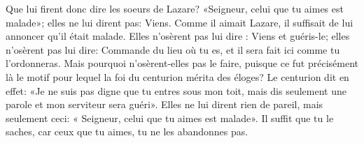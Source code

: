 Que lui firent donc dire les soeurs de Lazare?
	«Seigneur, celui que tu aimes est malade»;
	elles ne lui dirent pas: Viens.
Comme il aimait Lazare, il suffisait de lui annoncer qu’il était malade.
Elles n’osèrent pas lui dire : Viens et guéris-le;
	elles n’osèrent pas lui dire:
	Commande du lieu où tu es, et il sera fait ici comme tu l’ordonneras.
Mais pourquoi n’osèrent-elles pas le faire,
	puisque ce fut précisément là le motif
		pour lequel la foi du centurion mérita des éloges?
Le centurion dit en effet:
	«Je ne suis pas digne que tu entres sous mon toit,
	mais dis seulement une parole et mon serviteur sera guéri».
Elles ne lui dirent rien de pareil, mais seulement ceci:
	« Seigneur, celui que tu aimes est malade».
Il suffit que tu le saches,
	car ceux que tu aimes, tu ne les abandonnes pas.
